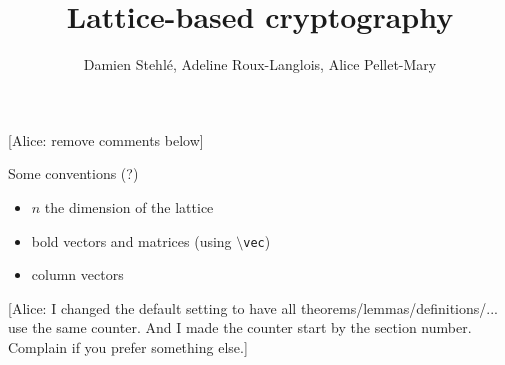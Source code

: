 \documentclass[a4paper,11pt]{article}
\title{Lattice-based cryptography}
\author{Damien Stehlé, Adeline Roux-Langlois, Alice Pellet-Mary}
\theoremstyle{definition}
\begin{document}
\maketitle

{\color{red} [Alice: remove comments below]}

Some conventions (?)
\begin{itemize}
\item $n$ the dimension of the lattice
\item bold vectors and matrices (using \texttt{$\setminus$vec})
\item column vectors
\end{itemize}

{\color{red} [Alice: I changed the default setting to have all theorems/lemmas/definitions/... use the same counter. And I made the counter start by the section number. Complain if you prefer something else.]}

\tableofcontents







\end{document}
